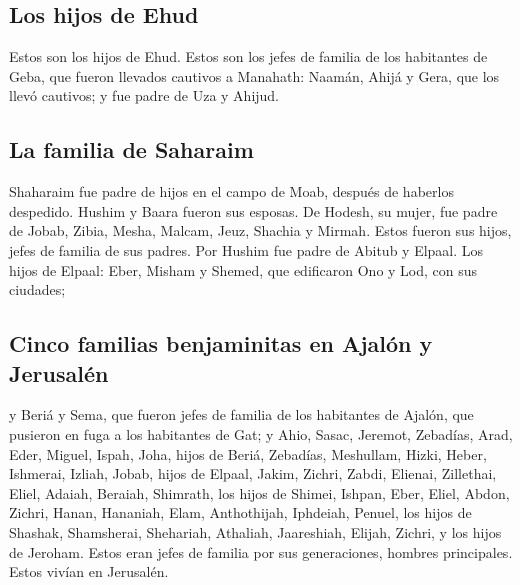 \hypertarget{los-hijos-de-ehud}{%
\subsection{Los hijos de Ehud}\label{los-hijos-de-ehud}}

 Estos son los hijos de Ehud. Estos son los jefes de
familia de los habitantes de Geba, que fueron llevados cautivos a
Manahath:  Naamán, Ahijá y Gera, que los llevó cautivos; y
fue padre de Uza y Ahijud.

\hypertarget{la-familia-de-saharaim}{%
\subsection{La familia de Saharaim}\label{la-familia-de-saharaim}}

 Shaharaim fue padre de hijos en el campo de Moab, después
de haberlos despedido. Hushim y Baara fueron sus esposas. 
De Hodesh, su mujer, fue padre de Jobab, Zibia, Mesha, Malcam,
 Jeuz, Shachia y Mirmah. Estos fueron sus hijos, jefes de
familia de sus padres.  Por Hushim fue padre de Abitub y
Elpaal.  Los hijos de Elpaal: Eber, Misham y Shemed, que
edificaron Ono y Lod, con sus ciudades;

\hypertarget{cinco-familias-benjaminitas-en-ajaluxf3n-y-jerusaluxe9n}{%
\subsection{Cinco familias benjaminitas en Ajalón y
Jerusalén}\label{cinco-familias-benjaminitas-en-ajaluxf3n-y-jerusaluxe9n}}

 y Beriá y Sema, que fueron jefes de familia de los
habitantes de Ajalón, que pusieron en fuga a los habitantes de Gat;
 y Ahio, Sasac, Jeremot,  Zebadías, Arad,
Eder,  Miguel, Ispah, Joha, hijos de Beriá,
 Zebadías, Meshullam, Hizki, Heber, 
Ishmerai, Izliah, Jobab, hijos de Elpaal,  Jakim, Zichri,
Zabdi,  Elienai, Zillethai, Eliel, 
Adaiah, Beraiah, Shimrath, los hijos de Shimei,  Ishpan,
Eber, Eliel,  Abdon, Zichri, Hanan, 
Hananiah, Elam, Anthothijah,  Iphdeiah, Penuel, los hijos
de Shashak,  Shamsherai, Shehariah, Athaliah,
 Jaareshiah, Elijah, Zichri, y los hijos de Jeroham.
 Estos eran jefes de familia por sus generaciones,
hombres principales. Estos vivían en Jerusalén.

